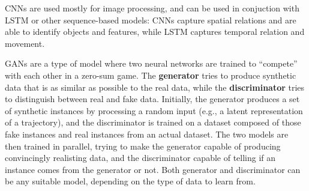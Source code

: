 CNNs are used mostly for image processing, and can be used in conjuction with LSTM or other sequence-based models: CNNs capture spatial relations and are able to identify objects and features, while LSTM captures temporal relation and movement.

GANs are a type of model where two neural networks are trained to ``compete'' with each other in a zero-sum game. The \textbf{generator} tries to produce synthetic data that is as similar as possible to the real data, while the \textbf{discriminator} tries to distinguish between real and fake data. Initially, the generator produces a set of synthetic instances by processing a random input (e.g., a latent representation of a trajectory), and the discriminator is trained on a dataset composed of those fake instances and real instances from an actual dataset. The two models are then trained in parallel, trying to make the generator capable of producing convincingly realisting data, and the discriminator capable of telling if an instance comes from the generator or not. Both generator and discriminator can be any suitable model, depending on the type of data to learn from.